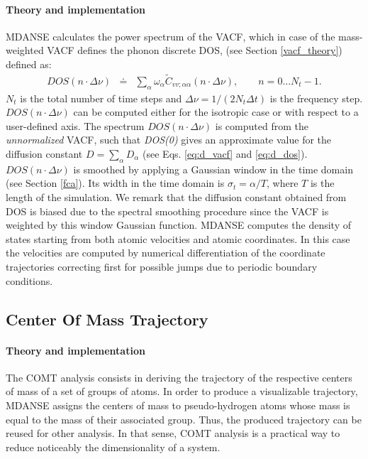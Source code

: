 \documentclass[a4paper,11pt]{article}
\begin{document}
\paragraph{Theory and implementation\\}
\label{dos_theory}
\gls{MDANSE} calculates the power spectrum of the \gls{VACF}, which in case of the mass-weighted \gls{VACF} defines the phonon 
discrete \gls{DOS}, (see Section \ref{vacf_theory}) defined as:
\begin{eqnarray}
DOS(n\cdot\Delta \nu)  &\doteq &\sum_{\alpha} \omega_\alpha 
\tilde C_{vv ; \alpha\alpha}(n\cdot\Delta \nu),\qquad n = 0\ldots N_t - 1.
\end{eqnarray}
$N_t$ is the total number of time steps and $\Delta\nu = 1/(2N_t \Delta t)$ is the frequency step. $DOS(n\cdot\Delta\nu)$ can 
be computed either for the isotropic case or with respect to a user-defined axis. The spectrum $DOS(n\cdot\Delta \nu)$ is computed from the 
\textit{unnormalized} \gls{VACF}, such that \textit{DOS(0)} gives an approximate value for the diffusion constant 
$D = \sum_\alpha D_\alpha$ (see Eqs. \ref{eq:d_vacf} and \ref{eq:d_dos}). $DOS(n\cdot\Delta \nu)$ is smoothed by 
applying a Gaussian window in the time domain \cite{Harris} (see Section \ref{fca}). Its width in the time domain is 
$\sigma_t=\alpha/T$, where $T$ is the length of 
the simulation. We remark that the diffusion constant obtained from \gls{DOS} is biased due to the spectral smoothing procedure since 
the \gls{VACF} is weighted by this window Gaussian function. \gls{MDANSE} computes the density of states starting from both atomic velocities 
and atomic coordinates. In this case the velocities are computed by numerical differentiation of the coordinate trajectories correcting 
first for possible jumps due to periodic boundary conditions.

\subsection{Center Of Mass Trajectory}
\label{comt}
\paragraph{Theory and implementation\\}
\label{comt_theory}
The \gls{COMT} analysis consists in deriving the trajectory of the respective centers of mass of a 
set of groups of atoms. In order to produce a visualizable trajectory, \gls{MDANSE} assigns the centers of mass to 
pseudo-hydrogen atoms whose mass is equal to the mass of their associated group. Thus, the produced trajectory can be reused 
for other analysis. In that sense, \gls{COMT} analysis is a practical way to reduce noticeably the dimensionality of a system.
\end{document}
